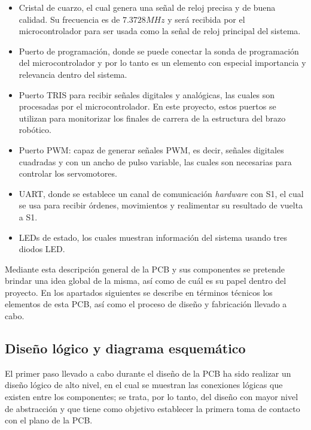 \begin{itemize}
    \item Cristal de cuarzo, el cual genera una señal de reloj precisa y de buena calidad. Su frecuencia es de $7.3728MHz$ y será recibida por el microcontrolador para ser usada como la señal de reloj principal del sistema.
    
    \item Puerto de programación, donde se puede conectar la sonda de programación del microcontrolador y por lo tanto es un elemento con especial importancia y relevancia dentro del sistema.
    
    \item Puerto TRIS para recibir señales digitales y analógicas, las cuales son procesadas por el microcontrolador. En este proyecto, estos puertos se utilizan para monitorizar los finales de carrera de la estructura del brazo robótico.
    
    \item Puerto PWM: capaz de generar señales PWM, es decir, señales digitales cuadradas y con un ancho de pulso variable, las cuales son necesarias para controlar los servomotores.
    
    \item UART, donde se establece un canal de comunicación \textit{hardware} con S1, el cual se usa para recibir órdenes, movimientos y realimentar su resultado de vuelta a S1.
    
    \item LEDs de estado, los cuales muestran información del sistema usando tres diodos LED.
\end{itemize}

Mediante esta descripción general de la \ac{PCB} y sus componentes se pretende brindar una idea global de la misma, así como de cuál es su papel dentro del proyecto. En los apartados siguientes se describe en términos técnicos los elementos de esta \ac{PCB}, así como el proceso de diseño y fabricación llevado a cabo.

\subsection{Diseño lógico y diagrama esquemático}

El primer paso llevado a cabo durante el diseño de la \ac{PCB} ha sido realizar un diseño lógico de alto nivel, en el cual se muestran las conexiones lógicas que existen entre los componentes; se trata, por lo tanto, del diseño con mayor nivel de abstracción y que tiene como objetivo establecer la primera toma de contacto con el plano de la \ac{PCB}.

